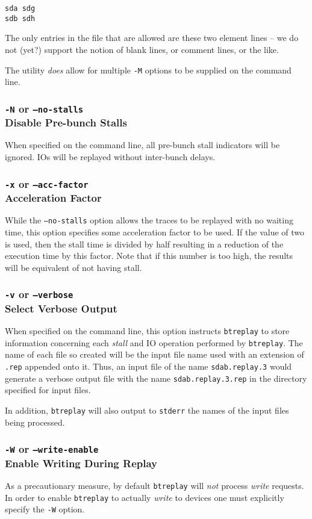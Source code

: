 \documentclass{article}
\begin{document}
\begin{verbatim}
sda sdg
sdb sdh
\end{verbatim}

The only entries in the file that are allowed are these two element lines
-- we do not (yet?) support the notion of blank lines, or comment lines, or
the like.

The utility \emph{does} allow for multiple \texttt{-M} options to be
supplied on the command line.

\subsubsection{\label{sec:o-N}\texttt{-N} or \texttt{--no-stalls}\\Disable
Pre-bunch Stalls}

When specified on the command line, all pre-bunch stall indicators will be
ignored. IOs will be replayed without inter-bunch delays.

\subsubsection{\label{sec:o-x}\texttt{-x} or \texttt{--acc-factor}\\Acceleration
Factor}

  While the \texttt{--no-stalls} option allows the traces to be replayed
  with no waiting time, this option specifies some acceleration factor
  to be used. If the value of two is used, then the stall time is
  divided by half resulting in a reduction of the execution time by
  this factor. Note that if this number is too high, the results will
  be equivalent of not having stall.

\subsubsection{\label{sec:p-o-v}\texttt{-v} or
\texttt{--verbose}\\Select Verbose Output}

When specified on the command line, this option instructs \texttt{btreplay}
to store information concerning each \emph{stall} and IO operation
performed by \texttt{btreplay}. The name of each file so created will be
the input file name used with an extension of \texttt{.rep} appended onto
it. Thus, an input file of the name \texttt{sdab.replay.3} would generate a
verbose output file with the name \texttt{sdab.replay.3.rep} in the
directory specified for input files.

In addition, \texttt{btreplay} will also output to \texttt{stderr} the
names of the input files being processed.

\subsubsection{\label{sec:p-o-W}\texttt{-W} or
\texttt{--write-enable}\\Enable Writing During Replay}

As a precautionary measure, by default \texttt{btreplay} will \emph{not}
process \emph{write} requests. In order to enable \texttt{btreplay} to
actually \emph{write} to devices one must explicitly specify the
\texttt{-W} option.
\end{document}
